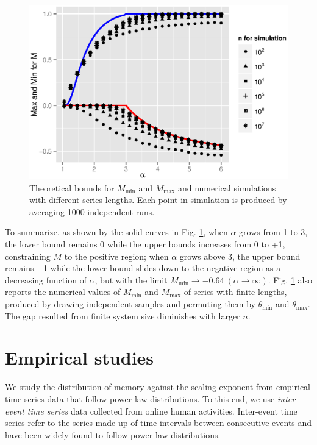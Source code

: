\begin{figure}[!h]
\begin{center}
\includegraphics[width=0.9\columnwidth]{figures/ch3_limitedSysSizeEffect.eps}
\caption{Theoretical bounds for $ M_{\min} $ and $ M_{\max} $ and numerical simulations with different series lengths. Each point in simulation is produced by averaging 1000 independent runs.}
\label{fig:limitedSysSize}
\end{center}
\end{figure}
To summarize, as shown by the solid curves in Fig. \ref{fig:limitedSysSize}, when $ \alpha $ grows from 1 to 3, the lower bound remains 0 while the upper bounds increases from 0 to +1, constraining $ M $ to the positive region; when $ \alpha $ grows above 3, the upper bound remains +1 while the lower bound slides down to the negative region as a decreasing function of $ \alpha $, but with the limit $ M_{\min} \rightarrow -0.64 \ (\alpha \rightarrow \infty) $. Fig. \ref{fig:limitedSysSize} also reports the numerical values of $ M_{\min} $ and $ M_{\max} $ of series with finite lengths, produced by drawing independent samples and permuting them by $ \theta_{\min} $ and $ \theta_{\max} $. The gap resulted from finite system size diminishes with larger $ n $. 

\section{Empirical studies}
We study the distribution of memory against the scaling exponent from empirical time series data that follow power-law distributions. To this end, we use \textit{inter-event time series} data collected from online human activities. Inter-event time series refer to the series made up of time intervals between consecutive events and have been widely found to follow power-law distributions. 


